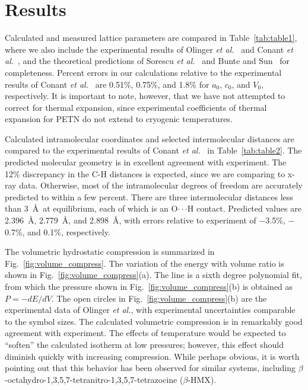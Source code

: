 \documentclass[prb,aps,nobibnotes,superbib,preprint]{revtex4}
\begin{document}
\section{Results}
\label{sec:results}
Calculated and measured lattice parameters are compared in
Table~\ref{tab:table1}, where we also include the experimental results
of Olinger {\it et al.}~\cite{Olinger_1975v62} and Conant {\it et
al.}~\cite{Conant_1979}, and the theoretical predictions of Sorescu
{\it et al.}~\cite{Sorescu_1999v103} and Bunte and
Sun~\cite{Bunte_2000v104} for completeness.  Percent errors in our
calculations relative to the experimental results of Conant {\it et
al.}~\cite{Conant_1979} are 0.51\%, 0.75\%, and 1.8\% for $a_0$,
$c_0$, and $V_0$, respectively.  It is important to note, however,
that we have not attempted to correct for thermal expansion, since
experimental coefficients of thermal expansion for PETN do not extend
to cryogenic temperatures.

Calculated intramolecular coordinates and selected intermolecular
distances are compared to the experimental results of Conant {\it et
al.}~\cite{Conant_1979} in Table~\ref{tab:table2}.  The predicted
molecular geometry is in excellent agreement with experiment.  The
12\% discrepancy in the C-H distances is expected, since we are
comparing to x-ray data.  Otherwise, most of the intramolecular
degrees of freedom are accurately predicted to within a few percent.
There are three intermolecular distances less than 3~\AA\ at
equilibrium, each of which is an O$\cdot\cdot\cdot$H contact.
Predicted values are 2.396~\AA, 2.779~\AA, and 2.898~\AA, with errors
relative to experiment of $-$3.5\%, $-$0.7\%, and 0.1\%, respectively.

The volumetric hydrostatic compression is summarized in
Fig.~\ref{fig:volume_compress}.  The variation of the energy with
volume ratio is shown in Fig.~\ref{fig:volume_compress}(a).  The line
is a sixth degree polynomial fit, from which the pressure shown in
Fig.~\ref{fig:volume_compress}(b) is obtained as $P=-dE/dV$.  The open
circles in Fig.~\ref{fig:volume_compress}(b) are the experimental data
of Olinger {\it et al.}, with experimental uncertainties comparable to
the symbol sizes.  The calculated volumetric compression is in
remarkably good agreement with experiment.  The effects of temperature
would be expected to ``soften'' the calculated isotherm at low
pressures;  however, this effect should diminish quickly with
increasing compression. While perhaps obvious, it is worth pointing out
that this behavior has been observed for similar systems, including 
$\beta$-octahydro-1,3,5,7-tetranitro-1,3,5,7-tetrazocine
($\beta$-HMX)\cite{Gump_2003,Sewell03_unpublished}.
\end{document}
